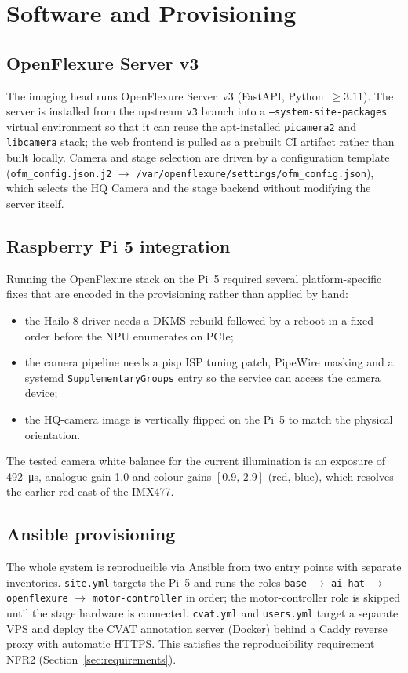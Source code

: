 \section{Software and Provisioning}
\label{sec:software}

\subsection{OpenFlexure Server v3}
The imaging head runs OpenFlexure Server~v3 (FastAPI, Python~$\geq 3.11$). The
server is installed from the upstream \texttt{v3} branch into a
\texttt{--system-site-packages} virtual environment so that it can reuse the
apt-installed \texttt{picamera2} and \texttt{libcamera} stack; the web frontend
is pulled as a prebuilt CI artifact rather than built locally. Camera and stage
selection are driven by a configuration template
(\texttt{ofm\_config.json.j2} $\rightarrow$
\texttt{/var/openflexure/settings/ofm\_config.json}), which selects the HQ
Camera and the stage backend without modifying the server itself.

\subsection{Raspberry Pi 5 integration}
Running the OpenFlexure stack on the Pi~5 required several platform-specific
fixes that are encoded in the provisioning rather than applied by hand:
\begin{itemize}
\item the Hailo-8 driver needs a DKMS rebuild followed by a reboot in a fixed
  order before the NPU enumerates on PCIe;
\item the camera pipeline needs a pisp ISP tuning patch, PipeWire masking and
  a systemd \texttt{SupplementaryGroups} entry so the service can access the
  camera device;
\item the HQ-camera image is vertically flipped on the Pi~5 to match the
  physical orientation.
\end{itemize}
The tested camera white balance for the current illumination is an exposure of
\SI{492}{\micro\second}, analogue gain \num{1.0} and colour gains
$[0.9,\,2.9]$ (red, blue), which resolves the earlier red cast of the IMX477.

\subsection{Ansible provisioning}
The whole system is reproducible via Ansible from two entry points with
separate inventories. \texttt{site.yml} targets the Pi~5 and runs the roles
\texttt{base} $\rightarrow$ \texttt{ai-hat} $\rightarrow$ \texttt{openflexure}
$\rightarrow$ \texttt{motor-controller} in order; the motor-controller role is
skipped until the stage hardware is connected. \texttt{cvat.yml} and
\texttt{users.yml} target a separate VPS and deploy the CVAT annotation server
(Docker) behind a Caddy reverse proxy with automatic HTTPS. This satisfies the
reproducibility requirement NFR2 (Section~\ref{sec:requirements}).

